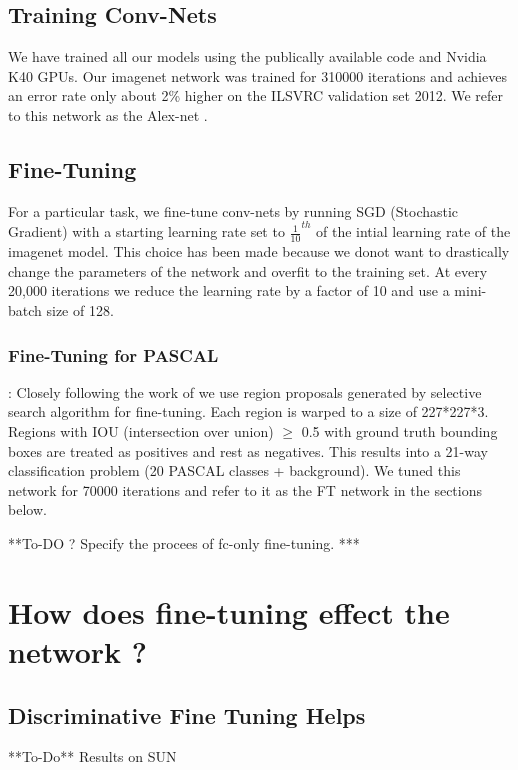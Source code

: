 \documentclass[runningheads]{llncs}
\begin{document}
\subsection{Training Conv-Nets}
We have trained all our models using the publically available code \cite{caffe} and Nvidia K40 GPUs. Our imagenet network was trained for 310000 iterations and achieves an error rate only about 2\% higher on the ILSVRC validation set 2012. We refer to this network as the Alex-net .

\subsection{Fine-Tuning}
For a particular task, we fine-tune conv-nets by running SGD (Stochastic Gradient) with a starting learning rate set to $\frac{1}{10}^{th}$ of the intial learning rate of the imagenet model. This choice has been made because we donot want to drastically change the parameters of the network and overfit to the training set. At every 20,000 iterations we reduce the learning rate by a factor of 10 and use a mini-batch size of 128.

\subsubsection{Fine-Tuning for PASCAL}: Closely following the work of \cite{rcnn} we use region proposals generated by selective search algorithm for fine-tuning. Each region is warped to a size of 227*227*3. Regions with IOU (intersection over union) $\geq$ 0.5 with ground truth bounding boxes are treated as positives and rest as negatives. This  results into a 21-way classification problem (20 PASCAL classes + background). We tuned this network for 70000 iterations and refer to it as the FT network in the sections below.

**To-DO ? Specify the procees of fc-only fine-tuning.  ***

\section{How does fine-tuning effect the network ?}



\subsection{Discriminative Fine Tuning Helps}
**To-Do** Results on SUN
\end{document}
